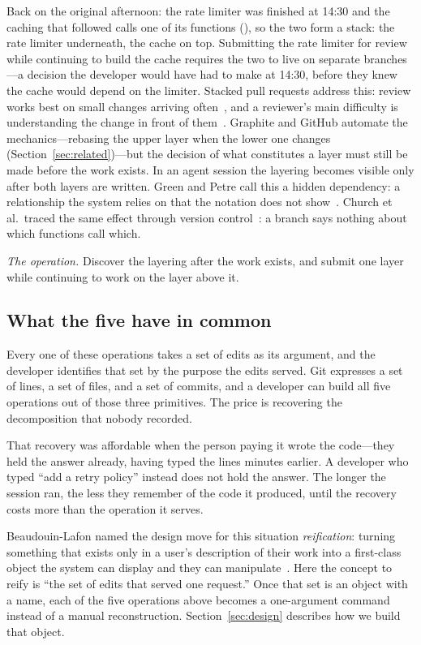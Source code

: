 Back on the original afternoon: the rate limiter was finished at 14:30 and the
caching that followed calls one of its functions (), so the
two form a stack: the rate limiter underneath, the cache on top. Submitting the rate limiter for review while continuing to build the cache
requires the two to live on separate branches---a decision the developer would
have had to make at 14:30, before they knew the cache would depend on the
limiter. Stacked pull requests address this: review works best on small changes
arriving often~\cite{rigby2013}, and a reviewer's main difficulty is
understanding the change in front of them~\cite{bacchelli2013}. Graphite and
GitHub automate the mechanics---rebasing the upper layer when the lower one
changes (Section~\ref{sec:related})---but the decision of what constitutes a
layer must still be made before the work exists. In an agent session the
layering becomes visible only after both layers are written. Green and Petre
call this a hidden dependency: a relationship the system relies on that the
notation does not show~\cite{green1996}. Church et al.\ traced the same effect
through version control~\cite{church2014}: a branch says nothing about which
functions call which.

\smallskip\noindent\emph{The operation.} Discover the layering after the work
exists, and submit one layer while continuing to work on the layer above it.

\subsection{What the five have in common}

Every one of these operations takes a set of edits as its argument, and the
developer identifies that set by the purpose the edits served. Git expresses a set
of lines, a set of files, and a set of commits, and a developer can build all five
operations out of those three primitives. The price is recovering the
decomposition that nobody recorded.

That recovery was affordable when the person paying it wrote the code---they held
the answer already, having typed the lines minutes earlier. A developer who typed
``add a retry policy'' instead does not hold the answer. The longer the session
ran, the less they remember of the code it produced, until the recovery costs more
than the operation it serves.

Beaudouin-Lafon named the design move for this situation \emph{reification}:
turning something that exists only in a user's description of their work into a
first-class object the system can display and they can
manipulate~\cite{beaudouinlafon2000}. Here the concept to reify is ``the set of
edits that served one request.'' Once that set is an object with a name, each of
the five operations above becomes a one-argument command instead of a manual
reconstruction. Section~\ref{sec:design} describes how we build that object.
